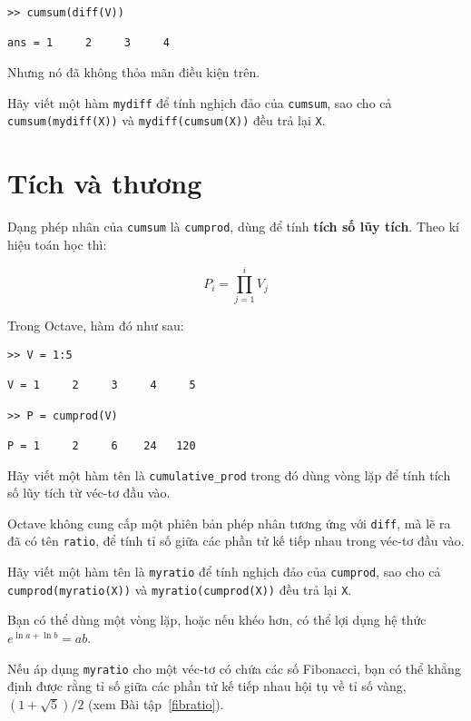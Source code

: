 \documentclass[12pt]{book}
\begin{document}
\begin{verbatim}
>> cumsum(diff(V))

ans = 1     2     3     4
\end{verbatim}
%
Nhưng nó đã không thỏa mãn điều kiện trên.

\begin{ex}
Hãy viết một hàm {\tt mydiff} để tính nghịch đảo của 
{\tt cumsum}, sao cho cả {\tt cumsum(mydiff(X))} và
{\tt mydiff(cumsum(X))} đều trả lại {\tt X}.
\end{ex}


\section{Tích và thương}

Dạng phép nhân của {\tt cumsum} là {\tt cumprod}, dùng để
tính {\bf tích số lũy tích}.  Theo kí hiệu toán học thì:

\[ P_i = \prod_{j=1}^i V_j \]

Trong Octave, hàm đó như sau:

\begin{verbatim}
>> V = 1:5

V = 1     2     3     4     5

>> P = cumprod(V)

P = 1     2     6    24   120
\end{verbatim}
%
\begin{ex}
Hãy viết một hàm tên là \verb#cumulative_prod# trong đó dùng
vòng lặp để tính tích số lũy tích từ véc-tơ đầu vào.
\end{ex}

Octave không cung cấp một phiên bản phép nhân tương ứng với
{\tt diff}, mà lẽ ra đã có tên {\tt ratio}, để tính tỉ số giữa các
phần tử kế tiếp nhau trong véc-tơ đầu vào.

\begin{ex}
Hãy viết một hàm tên là {\tt myratio} để tính nghịch đảo của
{\tt cumprod}, sao cho cả {\tt cumprod(myratio(X))} và
{\tt myratio(cumprod(X))} đều trả lại {\tt X}.

Bạn có thể dùng một vòng lặp, hoặc nếu khéo hơn, có thể lợi dụng
hệ thức $e^{\ln a + \ln b} = a b$.

Nếu áp dụng {\tt myratio} cho một véc-tơ có chứa các số Fibonacci,
bạn có thể khẳng định được rằng tỉ số giữa các phần tử kế tiếp nhau 
hội tụ về tỉ số vàng, $(1+\sqrt{5})/2$ (xem Bài tập~\ref{fibratio}).
\end{ex}
\end{document}
